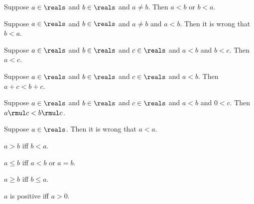 \begin{axiom}\label{real_lt_trichotomy}
    Suppose $a\in\reals$ and $b\in\reals$ and $a\neq b$.
    Then $a < b$ or $b < a$.
\end{axiom}

\begin{axiom}\label{real_lt_asym}
    Suppose $a\in\reals$ and $b\in\reals$ and $a\neq b$ and $a < b$.
    Then it is wrong that $b < a$.
\end{axiom}

\begin{axiom}\label{real_lt_trans}
    Suppose $a\in\reals$ and $b\in\reals$ and $c\in\reals$ and $a < b$ and $b < c$.
    Then $a < c$.
\end{axiom}

\begin{axiom}\label{real_lt_add}
    Suppose $a\in\reals$ and $b\in\reals$ and $c\in\reals$ and $a < b$.
    Then $a + c < b + c$.
\end{axiom}

\begin{axiom}\label{real_lt_mul_pos}
    Suppose $a\in\reals$ and $b\in\reals$ and $c\in\reals$ and $a < b$ and $0 < c$.
    Then $a \rmul c < b \rmul c$.
\end{axiom}

\begin{axiom}\label{real_lt_irreflexive}
    Suppose $a\in\reals$.
    Then it is wrong that $a < a$.
\end{axiom}

\begin{abbreviation}\label{real_gt}
    $a > b$ iff $b < a$.
\end{abbreviation}

\begin{abbreviation}\label{real_at_most}
    $a \leq b$ iff $a < b$ or $a = b$.
\end{abbreviation}

\begin{abbreviation}\label{real_at_least}
    $a \geq b$ iff $b \leq a$.
\end{abbreviation}

\begin{abbreviation}\label{real_positive}
    $a$ is positive iff $a > 0$.
\end{abbreviation}

